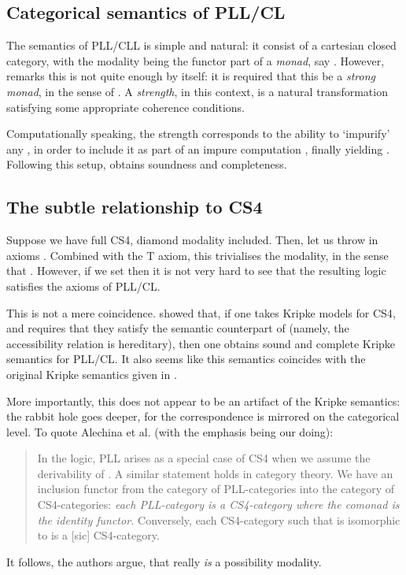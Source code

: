 \documentclass[a4paper]{amsart}
\begin{document}
\subsection{Categorical semantics of \textsf{PLL/CL}}

The semantics of \textsf{PLL/CLL} is simple and natural: it
consist of a cartesian closed category, with the modality
 being the functor part of a \emph{monad}, say
. However, \cite{Moggi1989} remarks this is
not quite enough by itself: it is required that this be a
\emph{strong monad}, in the sense of \cite{Kock1972}. A
\emph{strength}, in this context, is a natural transformation  satisfying some appropriate coherence conditions.

Computationally speaking, the strength corresponds to the ability
to `impurify' any , in order to include it as part of an impure
computation , finally yielding .  Following this setup, \cite{Moggi1989, Moggi1991} obtains
soundness and completeness.

\subsection{The subtle relationship to \textsf{CS4}}

Suppose we have full \textsf{CS4}, diamond modality included.
Then, let us throw in axioms . Combined with
the \textsf{T} axiom, this trivialises the  modality, in the
sense that . However, if we set  then it is not very hard to see that the resulting logic
satisfies the axioms of \textsf{PLL/CL}. 

This is not a mere coincidence. \cite{Alechina2001} showed that,
if one takes Kripke models for \textsf{CS4}, and requires that
they satisfy the semantic counterpart of 
(namely, the accessibility relation is hereditary), then one
obtains sound and complete Kripke semantics for \textsf{PLL/CL}.
It also seems like this semantics coincides with the original
Kripke semantics given in \cite{Fairtlough1997}.

More importantly, this does not appear to be an artifact of the
Kripke semantics: the rabbit hole goes deeper, for the
correspondence is mirrored on the categorical level. To quote
Alechina et al. (with the emphasis being our doing): \begin{quote}
  In the logic, \textsf{PLL} arises as a special case of
  \textsf{CS4} when we assume the derivability of . A similar statement holds in category theory. We have
  an inclusion functor from the category of
  \textsf{PLL}-categories into the category of
  \textsf{CS4}-categories: \emph{each \textsf{PLL}-category is a
  \textsf{CS4}-category where the comonad is the identity
  functor.} Conversely, each \textsf{CS4}-category such that  is isomorphic to  is a [sic] \textsf{CS4}-category.
\end{quote} It follows, the authors argue, that  really
\emph{is} a possibility modality.
\end{document}
